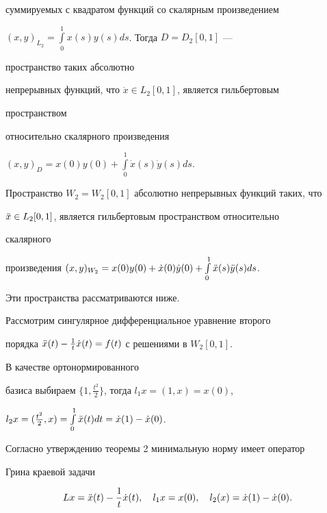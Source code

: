 суммируемых с квадратом функций со скалярным произведением  


$(x,y)_{L_2}=\int\limits^1_0 x(s)y(s)d s$. Тогда $D=D_2[0,1]$ --- 


пространство таких абсолютно 


непрерывных функций, что $\Dot x\in L_2[0,1]$, является гильбертовым 


пространством 


относительно скалярного произведения 


$(x,y)_D=x(0)y(0)+\int\limits^1_0\Dot x(s)\Dot y(s)d s$. 


Пространство $W_2=W_2[0,1]$ абсолютно непрерывных функций таких, что  


$\Ddot x\in L_2[0,1]$, является гильбертовым пространством относительно 


скалярного 


произведения $(x,y)_{W_2}=x(0)y(0)+\Dot x(0)\Dot y(0)+\int\limits^1_0 


\Ddot x(s)\Ddot y(s)d s$. 


Эти пространства рассматриваются ниже. 


 


\begin{exam} 


Рассмотрим сингулярное дифференциальное уравнение второго 


порядка $\Ddot x(t)-\frac{1}{t}\Dot x(t)=f(t)$ с решениями в $W_2[0,1]$. 


В качестве ортонормированного 


базиса выбираем $\{1,\frac{t^2}{2}\}$, тогда $l_1x=(1,x)=x(0)$, 


$l_2x=(\frac{t^2}{2},x)=\int\limits^1_0\Ddot x(t)d t=\Dot x(1)-\Dot x(0)$. 


 


Согласно утверждению теоремы 2 минимальную норму имеет оператор  


Грина краевой задачи 


$$ 


L x=\Ddot x(t)-\frac{1}{t}\Dot x(t),\quad 


l_1x=x(0),\quad l_2(x)=\Dot x(1)-\Dot x(0). 


$$ 


\end{exam} 


 


